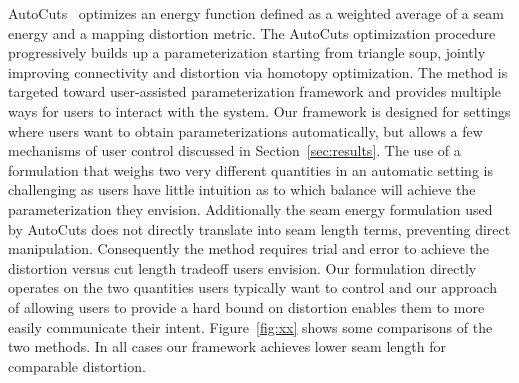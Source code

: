 %

AutoCuts~\cite{Poranne2017Autocuts} optimizes an energy function defined as a weighted average of a seam energy and a mapping distortion metric. The AutoCuts optimization procedure progressively builds up a parameterization starting from triangle soup, jointly improving connectivity and distortion via homotopy optimization. 
The method is targeted toward user-assisted parameterization framework and provides multiple ways for users to interact with the system. Our framework is designed for settings where users want to obtain parameterizations automatically, but allows a few mechanisms of user control discussed in Section~\ref{sec:results}. 
The use of a formulation that weighs two very different quantities  in an automatic setting is challenging as users have little intuition as to which balance will achieve the parameterization they envision. Additionally the seam energy formulation used by AutoCuts does not directly translate into seam length terms, preventing direct manipulation. Consequently the method requires trial and error to achieve the distortion versus cut length tradeoff users envision.  
Our formulation directly operates on the two quantities users typically want to control and our approach of allowing users to provide a hard bound on distortion enables them to more easily communicate their intent. Figure~\ref{fig:xx} shows some comparisons of the two methods. In all cases our framework achieves lower seam length for comparable distortion. 

